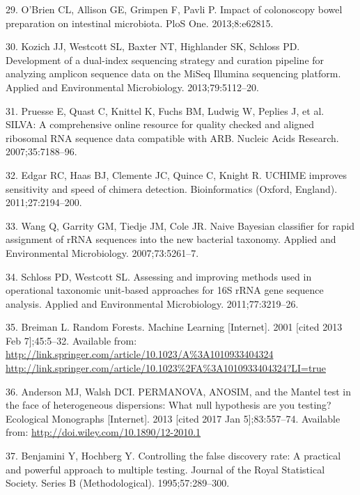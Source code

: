 \documentclass[12pt,]{article}
\begin{document}
\hypertarget{ref-obrien_impact_2013}{}
29. O'Brien CL, Allison GE, Grimpen F, Pavli P. Impact of colonoscopy
bowel preparation on intestinal microbiota. PloS One. 2013;8:e62815.

\hypertarget{ref-kozich_development_2013}{}
30. Kozich JJ, Westcott SL, Baxter NT, Highlander SK, Schloss PD.
Development of a dual-index sequencing strategy and curation pipeline
for analyzing amplicon sequence data on the MiSeq Illumina sequencing
platform. Applied and Environmental Microbiology. 2013;79:5112--20.

\hypertarget{ref-pruesse_silva_2007}{}
31. Pruesse E, Quast C, Knittel K, Fuchs BM, Ludwig W, Peplies J, et al.
SILVA: A comprehensive online resource for quality checked and aligned
ribosomal RNA sequence data compatible with ARB. Nucleic Acids Research.
2007;35:7188--96.

\hypertarget{ref-edgar_uchime_2011}{}
32. Edgar RC, Haas BJ, Clemente JC, Quince C, Knight R. UCHIME improves
sensitivity and speed of chimera detection. Bioinformatics (Oxford,
England). 2011;27:2194--200.

\hypertarget{ref-wang_naive_2007}{}
33. Wang Q, Garrity GM, Tiedje JM, Cole JR. Naive Bayesian classifier
for rapid assignment of rRNA sequences into the new bacterial taxonomy.
Applied and Environmental Microbiology. 2007;73:5261--7.

\hypertarget{ref-schloss_assessing_2011}{}
34. Schloss PD, Westcott SL. Assessing and improving methods used in
operational taxonomic unit-based approaches for 16S rRNA gene sequence
analysis. Applied and Environmental Microbiology. 2011;77:3219--26.

\hypertarget{ref-breiman_random_2001}{}
35. Breiman L. Random Forests. Machine Learning {[}Internet{]}. 2001
{[}cited 2013 Feb 7{]};45:5--32. Available from:
\href{http://link.springer.com/article/10.1023/A\%3A1010933404324\%20http://link.springer.com/article/10.1023\%2FA\%3A1010933404324?LI=true}{http://link.springer.com/article/10.1023/A\%3A1010933404324 http://link.springer.com/article/10.1023\%2FA\%3A1010933404324?LI=true}

\hypertarget{ref-anderson_permanova_2013}{}
36. Anderson MJ, Walsh DCI. PERMANOVA, ANOSIM, and the Mantel test in
the face of heterogeneous dispersions: What null hypothesis are you
testing? Ecological Monographs {[}Internet{]}. 2013 {[}cited 2017 Jan
5{]};83:557--74. Available from:
\url{http://doi.wiley.com/10.1890/12-2010.1}

\hypertarget{ref-benjamini_controlling_1995}{}
37. Benjamini Y, Hochberg Y. Controlling the false discovery rate: A
practical and powerful approach to multiple testing. Journal of the
Royal Statistical Society. Series B (Methodological). 1995;57:289--300.
\end{document}
